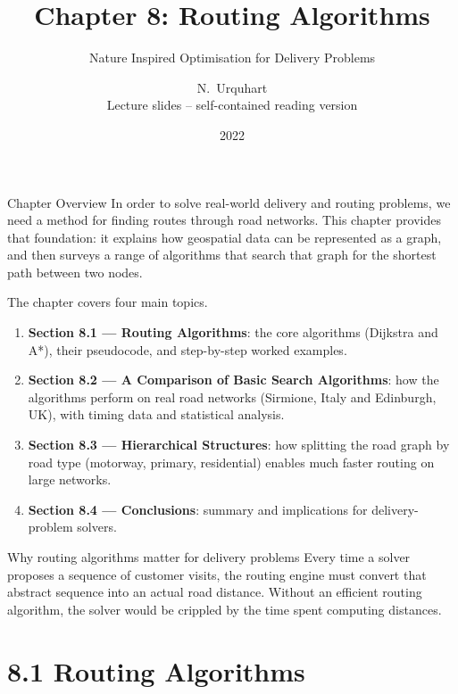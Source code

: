 \documentclass[aspectratio=169,10pt]{beamer}
\title[Chapter 8: Routing Algorithms]{%
  Chapter 8: Routing Algorithms}
\subtitle{Nature Inspired Optimisation for Delivery Problems}
\author{N.~Urquhart \\ \small{Lecture slides -- self-contained reading version}}
\date{2022}
\institute{Natural Computing Series, Springer}
\begin{document}

\begin{frame}
  \titlepage
\end{frame}

\begin{frame}{Chapter Overview}
  In order to solve real-world delivery and routing problems, we need a
  method for finding routes through road networks.  This chapter provides
  that foundation: it explains how geospatial data can be represented as
  a graph, and then surveys a range of algorithms that search that graph
  for the shortest path between two nodes.

  \medskip
  The chapter covers four main topics.

  \begin{enumerate}
    \item \textbf{Section 8.1 --- Routing Algorithms}: the core algorithms
      (Dijkstra and A*), their pseudocode, and step-by-step worked examples.
    \item \textbf{Section 8.2 --- A Comparison of Basic Search Algorithms}:
      how the algorithms perform on real road networks (Sirmione, Italy and
      Edinburgh, UK), with timing data and statistical analysis.
    \item \textbf{Section 8.3 --- Hierarchical Structures}: how splitting
      the road graph by road type (motorway, primary, residential) enables
      much faster routing on large networks.
    \item \textbf{Section 8.4 --- Conclusions}: summary and implications for
      delivery-problem solvers.
  \end{enumerate}

  \begin{alertblock}{Why routing algorithms matter for delivery problems}
    Every time a solver proposes a sequence of customer visits, the routing
    engine must convert that abstract sequence into an actual road distance.
    Without an efficient routing algorithm, the solver would be crippled by
    the time spent computing distances.
  \end{alertblock}
\end{frame}

\section{8.1 Routing Algorithms}
\end{document}
